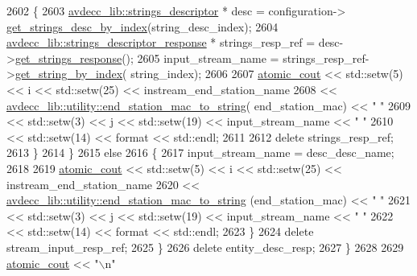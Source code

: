 \begin{DoxyCode}
2602                 \{
2603                     \hyperlink{classavdecc__lib_1_1strings__descriptor}{avdecc\_lib::strings\_descriptor} * desc = configuration->
      \hyperlink{classavdecc__lib_1_1configuration__descriptor_a34531c290e12e85895a804c067e9919e}{get\_strings\_desc\_by\_index}(string\_desc\_index);
2604                     \hyperlink{classavdecc__lib_1_1strings__descriptor__response}{avdecc\_lib::strings\_descriptor\_response} * 
      strings\_resp\_ref = desc->\hyperlink{classavdecc__lib_1_1strings__descriptor_a313776812dd7fa955eb6e60c9c92956a}{get\_strings\_response}();
2605                     input\_stream\_name = strings\_resp\_ref->\hyperlink{classavdecc__lib_1_1strings__descriptor__response_ae8f3e50f4e5051488a864fd8acc6da31}{get\_string\_by\_index}(
      string\_index);
2606 
2607                     \hyperlink{cmd__line_8h_a0bc38ccc65c79ba06c6fcd7b4bf554c3}{atomic\_cout} << std::setw(5) << i << std::setw(25) << 
      instream\_end\_station\_name
2608                                 << 
      \hyperlink{namespaceavdecc__lib_1_1utility_a5a8f858065c29351840fac0842d82450}{avdecc\_lib::utility::end\_station\_mac\_to\_string}(
      end\_station\_mac) << \textcolor{stringliteral}{"   "}
2609                                 << std::setw(3) << j << std::setw(19) << input\_stream\_name << \textcolor{stringliteral}{"   "}
2610                                 << std::setw(14) << format << std::endl;
2611 
2612                     \textcolor{keyword}{delete} strings\_resp\_ref;
2613                 \}
2614             \}
2615             \textcolor{keywordflow}{else}
2616             \{
2617                 input\_stream\_name = desc\_desc\_name;
2618 
2619                 \hyperlink{cmd__line_8h_a0bc38ccc65c79ba06c6fcd7b4bf554c3}{atomic\_cout} << std::setw(5) << i << std::setw(25) << instream\_end\_station\_name
2620                             << \hyperlink{namespaceavdecc__lib_1_1utility_a5a8f858065c29351840fac0842d82450}{avdecc\_lib::utility::end\_station\_mac\_to\_string}
      (end\_station\_mac) << \textcolor{stringliteral}{"   "}
2621                             << std::setw(3) << j << std::setw(19) << input\_stream\_name << \textcolor{stringliteral}{"   "}
2622                             << std::setw(14) << format << std::endl;
2623             \}
2624             \textcolor{keyword}{delete} stream\_input\_resp\_ref;
2625         \}
2626         \textcolor{keyword}{delete} entity\_desc\_resp;
2627     \}
2628 
2629     \hyperlink{cmd__line_8h_a0bc38ccc65c79ba06c6fcd7b4bf554c3}{atomic\_cout} << \textcolor{stringliteral}{"\(\backslash\)n"}

\end{DoxyCode}
